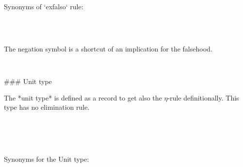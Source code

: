 Synonyms of `exfalso` rule:

\begin{code}%
\>[0]\AgdaSpace{}%
\AgdaSymbol{=}\AgdaSpace{}%
\<%
\\
\>[0]%
\>[11]\AgdaSymbol{=}\AgdaSpace{}%
\<%
\\
\>[0]%
\>[11]\AgdaSymbol{=}\AgdaSpace{}%
\<%
\end{code}

The negation symbol is a shortcut of an implication for the falsehood.

\begin{code}%
\>[0]\AgdaSpace{}%
\AgdaSymbol{:}\AgdaSpace{}%
\AgdaSpace{}%
\AgdaSpace{}%
\AgdaSpace{}%
\AgdaSpace{}%
\<%
\\
\>[0]\AgdaSpace{}%
\AgdaSpace{}%
\AgdaSymbol{=}\AgdaSpace{}%
\AgdaSymbol{(}\AgdaSpace{}%
\AgdaSpace{}%
\AgdaSpace{}%
\AgdaSymbol{\{}\AgdaSymbol{\})}\<%
\end{code}

### Unit type

The *unit type* is defined as a record to get also the $η$-rule
definitionally. This type has no elimination rule.

\begin{code}%
\>[0]\AgdaSpace{}%
\AgdaSpace{}%
\AgdaSymbol{:}\AgdaSpace{}%
\AgdaSpace{}%
\AgdaSpace{}%
\<%
\\
\>[0][@{}l@{\AgdaIndent{0}}]%
\>[2]\AgdaSpace{}%
\<%
\\
%
\\[\AgdaEmptyExtraSkip]%
\>[0]\AgdaSymbol{\{-\#}\AgdaSpace{}%
\AgdaSpace{}%
\AgdaSpace{}%
\AgdaSpace{}%
\AgdaSymbol{\#-\}}\<%
\end{code}

Synonyms for the Unit type:
\begin{code}%
\>[0]\AgdaSpace{}%
\AgdaSymbol{=}\AgdaSpace{}%
\<%
\\
\>[0]%
\>[5]\AgdaSymbol{=}\AgdaSpace{}%
\<%
\end{code}

